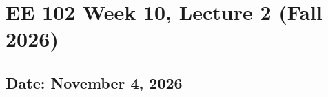 \documentclass{ee102_notes}
\renewcommand{\releasedate}{November 4, 2026}
\begin{document}
\section*{EE 102 Week 10, Lecture 2 (Fall 2026)}
\subsection*{Date: \releasedate}
\tableofcontents

\end{document}
